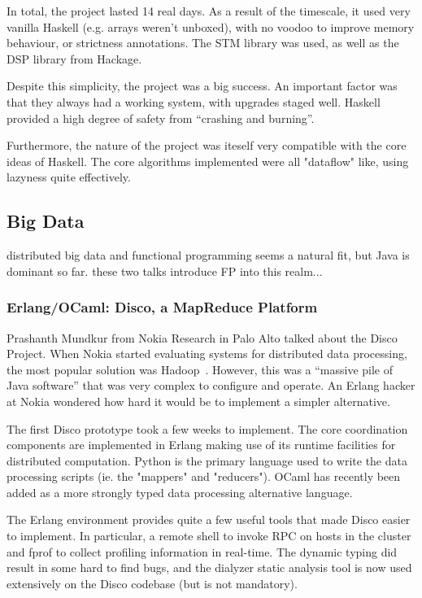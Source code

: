 \documentclass{jfp1}
\begin{document}
In total, the project lasted 14 real days. As a result of the timescale, it
used very vanilla Haskell (e.g. arrays weren't unboxed), with no voodoo to
improve memory behaviour, or strictness annotations. The STM library was used,
as well as the DSP library from Hackage.

Despite this simplicity, the project was a big success. An important factor was that 
they always had a working system, with upgrades staged well. Haskell provided a high
degree of safety from ``crashing and burning''.

Furthermore, the nature of the project was iteself very compatible with the core
ideas of Haskell. The core algorithms implemented were all "dataflow" like, using
lazyness quite effectively.

\subsection{Big Data}

distributed big data and functional programming seems a natural fit, but Java is dominant so far. these two talks introduce FP into this realm...

\subsubsection{Erlang/OCaml: Disco, a MapReduce Platform}

Prashanth Mundkur from Nokia Research in Palo Alto talked about the Disco Project.  When Nokia started evaluating systems for distributed data processing, the most popular solution was Hadoop~\cite{x}. However, this was a ``massive pile of Java software'' that was very complex to configure and operate. An Erlang hacker at Nokia wondered how hard it would be to implement a simpler alternative. 

The first Disco prototype took a few weeks to implement. The core coordination components are implemented in Erlang making use of its runtime facilities for distributed computation. Python is the primary language used to write the data processing scripts (ie. the "mappers" and "reducers"). OCaml has recently been added as a more strongly typed data processing alternative language.

The Erlang environment provides quite a few useful tools that made Disco easier to implement. In particular, a remote shell to invoke RPC on hosts in the cluster and fprof to collect profiling information in real-time. The dynamic typing did result in some hard to find bugs, and the dialyzer static analysis tool is now used extensively on the Disco codebase (but is not mandatory).
\end{document}
